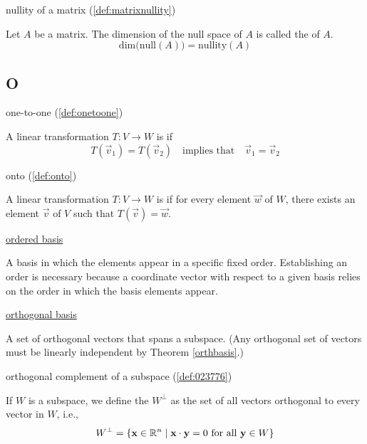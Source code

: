 \documentclass{ximera}
\begin{document}
nullity of a matrix (\ref{def:matrixnullity})
\begin{expandable}
    Let $A$ be a matrix.  The dimension of the null space of $A$ is called the  of $A$.
$$\mbox{dim}\Big(\mbox{null}(A)\Big)=\mbox{nullity}(A)$$
\end{expandable}


\subsection*{O}
one-to-one (\ref{def:onetoone})
\begin{expandable}
    A linear transformation $T:V\rightarrow W$ is  if 
$$T(\vec{v}_1)=T(\vec{v}_2)\quad \text{implies that}\quad \vec{v}_1=\vec{v}_2$$
\end{expandable}

onto (\ref{def:onto})
\begin{expandable}
    A linear transformation $T:V\rightarrow W$ is  if for every element $\vec{w}$ of $W$, there exists an element $\vec{v}$ of $V$ such that $T(\vec{v})=\vec{w}$.
\end{expandable}

\href{https://ximera.osu.edu/oerlinalg/LinearAlgebra/VSP-0060/main}{ordered basis}
\begin{expandable}
    A basis in which the elements appear in a specific fixed order.  Establishing an order is necessary because a coordinate vector with respect to a given basis relies on the order in which the basis elements appear.
\end{expandable}

\href{https://ximera.osu.edu/oerlinalg/LinearAlgebra/RTH-0010/main}{orthogonal basis}
\begin{expandable}
    A set of orthogonal vectors that spans a subspace. (Any orthogonal set of vectors must be linearly independent by Theorem \ref{orthbasis}.)
\end{expandable}

orthogonal complement of a subspace (\ref{def:023776})
\begin{expandable}
    If $W$ is a subspace, we define the  $W^\perp$ as the set of all vectors orthogonal to every vector in $W$, i.e.,
\begin{equation*}
W^\perp = \{\mathbf{x} \in\mathbb{R}^n \mid \mathbf{x} \cdot \mathbf{y} = 0 \mbox{ for all } \mathbf{y} \in W\}
\end{equation*}
\end{expandable}
\end{document}
